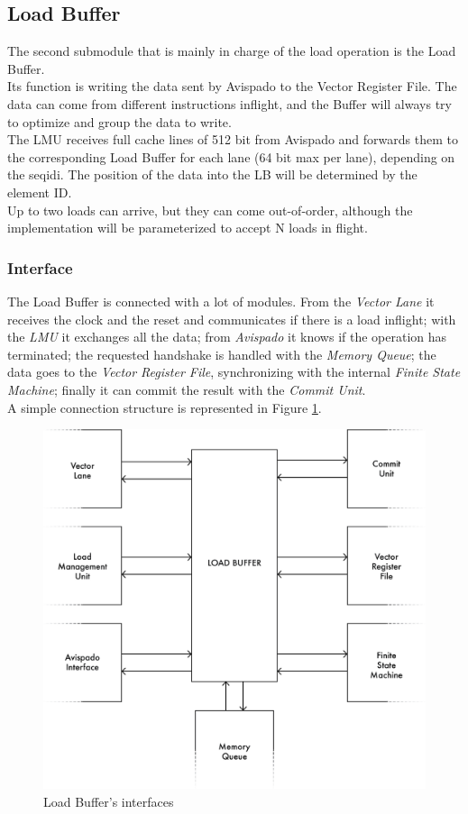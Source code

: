 \subsection{Load Buffer}
The second submodule that is mainly in charge of the load operation is the Load Buffer.\\
Its function is writing the data sent by Avispado to the Vector Register File. The data can come from different instructions inflight, and the Buffer will always try to optimize and group the data to write.\\

The LMU receives full cache lines of 512 bit from Avispado and forwards them to the corresponding Load Buffer for each lane (64 bit max per lane), depending on the seq\+id\+i. The position of the data into the LB will be determined by the element ID.\\

Up to two loads can arrive, but they can come out-of-order, although the implementation will be parameterized to accept N loads in flight.
\subsubsection{Interface}
The Load Buffer is connected with a lot of modules. From the \emph{Vector Lane} it receives the clock and the reset and communicates if there is a load inflight; with the \emph{LMU} it exchanges all the data; from \emph{Avispado} it knows if the operation has terminated; the requested handshake is handled with the \emph{Memory Queue}; the data goes to the \emph{Vector Register File}, synchronizing with the internal \emph{Finite State Machine}; finally it can commit the result with the \emph{Commit Unit}.\\

A simple connection structure is represented in Figure \ref{lb-if}.

\begin{figure}[H]
    \centering
    \includegraphics[scale = 0.4]{Chapter_2/img/lb-if.png}
    \caption{Load Buffer's interfaces}
    \label{lb-if}
\end{figure}

